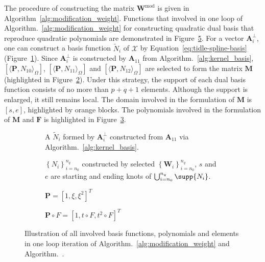 The procedure of constructing the matrix $\mathbf{W}^\text{mod}$ is given in Algorithm~\ref{alg:modification_weight}. Functions that involved in one loop of Algorithm.~\ref{alg:modification_weight} for constructing quadratic dual basis that reproduce quadratic polynomials are demonstrated in Figure~\ref{fig:weight-modification-algorithm}. For a vector $\mathbf{A}^\perp_i$, one can construct a basis function $\tilde{N}_i$ of $\mathcal{X}$ by Equation~\eqref{eq:tidle-spline-basis} (Figure~\ref{fig:weight-modification-a}). Since $\mathbf{A}^\perp_i$ is constructed by $\mathbf{A}_{11}$ from Algorithm.~\ref{alg:kernel_basis}, $\left[\langle\mathbf{P}, N_{10}\rangle_\Omega\right]$, $\left[\langle\mathbf{P}, N_{11}\rangle_\Omega\right]$ and $\left[\langle\mathbf{P}, N_{12}\rangle_\Omega\right]$ are selected to form the matrix $\mathbf{M}$ (highlighted in Figure~\ref{fig:weight-modification-b}). Under this strategy, the support of each dual basis function consists of no more than $p+q+1$ elements. Although the support is enlarged, it still remains local. The domain involved in the formulation of $\mathbf{M}$ is $\left[ s, e \right]$, highlighted by orange blocks. The polynomials involved in the formulation of $\mathbf{M}$ and $\mathbf{F}$ is highlighted in Figure~\ref{fig:weight-modification-c}.

\begin{figure}[ht]
	\begin{subfigure}{\linewidth}
		\center
		\caption{A $\tilde{N}_i$ formed by $\mathbf{A}_i^\perp$ constructed from $\mathbf{A}_{11}$ via Algorithm.~\ref{alg:kernel_basis}.}\label{fig:weight-modification-a}
	\end{subfigure}
	\begin{subfigure}{\linewidth}
		\center
		\caption{$\left\{N_i\right\}_{i=n_0}^{n_q}$ constructed by selected $\left\{\mathbf{W}_i\right\}_{i=n_0}^{n_q}$, $s$ and $e$ are starting and ending knots of $\bigcup_{i=n_0}^{n_q}\supp{N_i}$.}\label{fig:weight-modification-b}
	\end{subfigure}
	\begin{subfigure}{\linewidth}
		\center
		\caption{$\mathbf{P}=\left[1, \xi, \xi^2\right]^T$}\label{fig:weight-modification-c}
	\end{subfigure}
	\begin{subfigure}{\linewidth}
		\center
		\caption{$\mathbf{P}\circ F=\left[1, t \circ F, t^2 \circ F\right]^T$}\label{fig:weight-modification-d}
	\end{subfigure}
	\caption{Illustration of all involved basis functions, polynomials and elements in one loop iteration of Algorithm.~\ref{alg:modification_weight} and Algorithm.~. }
	\label{fig:weight-modification-algorithm}
\end{figure}

